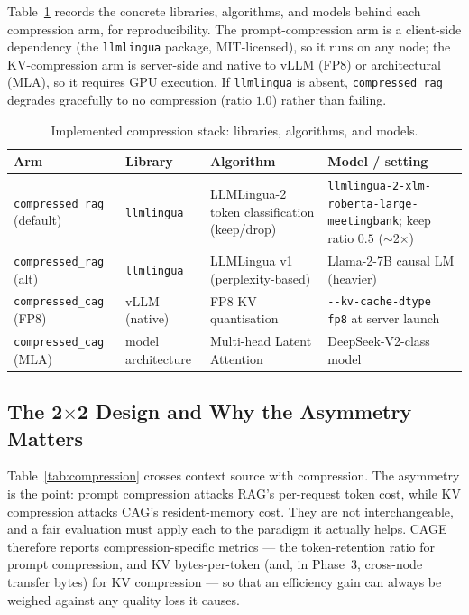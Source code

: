 \documentclass[12pt,a4paper]{article}
\let\cite\citep
\begin{document}
Table~\ref{tab:compstack} records the concrete libraries, algorithms, and models
behind each compression arm, for reproducibility. The prompt-compression arm is a
client-side dependency (the \texttt{llmlingua} package, MIT-licensed), so it runs on
any node; the KV-compression arm is server-side and native to vLLM (FP8) or
architectural (MLA), so it requires GPU execution. If \texttt{llmlingua} is absent,
\texttt{compressed\_rag} degrades gracefully to no compression (ratio $1.0$) rather
than failing.

\begin{table}[H]
\centering
\caption{Implemented compression stack: libraries, algorithms, and models.}
\label{tab:compstack}
\footnotesize
\begin{tabular}{@{}p{2.6cm}p{2.2cm}p{3.2cm}p{3.4cm}@{}}
\toprule
\textbf{Arm} & \textbf{Library} & \textbf{Algorithm} & \textbf{Model / setting} \\
\midrule
\texttt{compressed\_rag} (default) & \texttt{llmlingua}~\cite{llmlingua2} & LLMLingua-2 token classification (keep/drop) & \texttt{llmlingua-2-xlm-roberta-large-meetingbank}; keep ratio $0.5$ ($\sim$2$\times$) \\
\texttt{compressed\_rag} (alt) & \texttt{llmlingua}~\cite{llmlingua} & LLMLingua v1 (perplexity-based) & Llama-2-7B causal LM (heavier) \\
\texttt{compressed\_cag} (FP8) & vLLM (native) & FP8 KV quantisation~\cite{kvtuner} & \texttt{-{}-kv-cache-dtype fp8} at server launch \\
\texttt{compressed\_cag} (MLA) & model architecture & Multi-head Latent Attention~\cite{deepseekv2} & DeepSeek-V2-class model \\
\bottomrule
\end{tabular}
\end{table}

\subsection{The 2$\times$2 Design and Why the Asymmetry Matters}

Table~\ref{tab:compression} crosses context source with compression. The asymmetry
is the point: prompt compression attacks RAG's per-request token cost, while KV
compression attacks CAG's resident-memory cost. They are not interchangeable, and a
fair evaluation must apply each to the paradigm it actually helps. CAGE therefore
reports compression-specific metrics --- the token-retention ratio for prompt
compression, and KV bytes-per-token (and, in Phase~3, cross-node transfer bytes)
for KV compression --- so that an efficiency gain can always be weighed against any
quality loss it causes.
\end{document}
